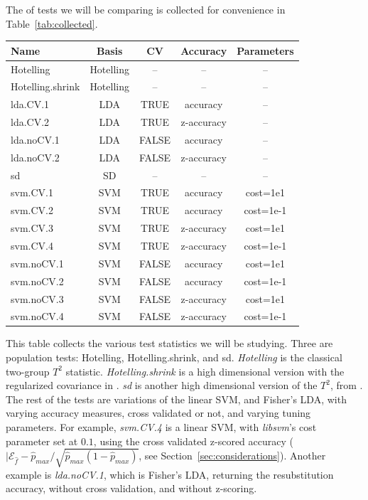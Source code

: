 \documentclass[12pt,a4paper]{article}
\theoremstyle{definition}
\newcommand{\hyp}{f} %
\newcommand{\hypEstim}{\hat{\hyp}} %
\newcommand{\acc}{\mathcal{E}}
\newcommand{\majority}{\hat{p}_{max}}
\begin{document}
The of tests we will be comparing is collected for convenience in Table~\ref{tab:collected}.
\begin{tcolorbox}
\centering
\begin{tabular}{l|c|c|c|c}
Name & Basis & CV & Accuracy & Parameters\\ 
\hline
\hline
Hotelling & Hotelling & -- & -- & -- \\ 
Hotelling.shrink & Hotelling & -- & -- & -- \\ 
lda.CV.1 & LDA & TRUE & accuracy &  -- \\ 
lda.CV.2 & LDA & TRUE & z-accuracy & -- \\ 
lda.noCV.1 & LDA & FALSE & accuracy &  --\\ 
lda.noCV.2 & LDA & FALSE & z-accuracy &  --\\ 
sd & SD & -- & -- & -- \\ 
svm.CV.1 & SVM & TRUE & accuracy & cost=1e1 \\ 
svm.CV.2 & SVM & TRUE & accuracy & cost=1e-1 \\ 
svm.CV.3 & SVM & TRUE & z-accuracy & cost=1e1 \\ 
svm.CV.4 & SVM & TRUE & z-accuracy & cost=1e-1 \\ 
svm.noCV.1 & SVM & FALSE & accuracy & cost=1e1 \\ 
svm.noCV.2 & SVM & FALSE & accuracy & cost=1e-1 \\ 
svm.noCV.3 & SVM & FALSE & z-accuracy & cost=1e1 \\ 
svm.noCV.4 & SVM & FALSE & z-accuracy & cost=1e-1 \\
\end{tabular} 
\captionsetup{type=table}
\caption{\footnotesize
This table collects the various test statistics we will be studying. 
Three are population tests: Hotelling, Hotelling.shrink, and sd.
\textit{Hotelling} is the classical two-group $T^2$ statistic. 
\textit{Hotelling.shrink} is a high dimensional version with the regularized covariance in \cite{schafer_shrinkage_2005}. 
\textit{sd} is another high dimensional version of the $T^2$, from \cite{srivastava_two_2013}. 
The rest of the tests are variations of the linear SVM, and Fisher's LDA, with varying accuracy measures, cross validated or not, and varying tuning parameters. 
For example, \textit{svm.CV.4} is a linear SVM, with \textit{libsvm}'s cost parameter set at $0.1$, using the cross validated z-scored accuracy ($|\acc_{\hypEstim}-\majority/\sqrt{\majority(1-\majority)}$, see Section~\ref{sec:considerations}).
Another example is \textit{lda.noCV.1}, which is Fisher's LDA, returning the resubstitution accuracy, without cross validation, and without z-scoring.}
\label{tab:collected}
\end{tcolorbox}
\end{document}
